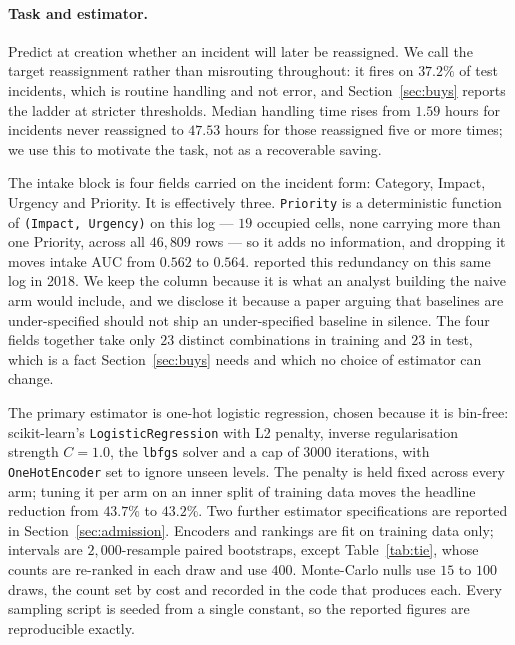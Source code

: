 \documentclass[preprint,12pt]{elsarticle}
\begin{document}
\paragraph{Task and estimator.}
Predict at creation whether an incident will later be reassigned. We call
the target reassignment rather than misrouting throughout: it fires on
$37.2\%$ of test incidents, which is routine handling and not error, and
Section~\ref{sec:buys} reports the ladder at stricter thresholds. Median
handling time rises from $1.59$ hours for incidents never reassigned to
$47.53$ hours for those reassigned five or more times; we use this to
motivate the task, not as a recoverable saving.

The intake block is four fields carried on the incident form: Category,
Impact, Urgency and Priority. It is effectively three. \texttt{Priority} is a
deterministic function of \texttt{(Impact, Urgency)} on this log --- $19$
occupied cells, none carrying more than one Priority, across all $46{,}809$
rows --- so it adds no information, and dropping it moves intake AUC from
$0.562$ to $0.564$. \citet{sarnovsky2018predictive} reported this redundancy
on this same log in 2018. We keep the column because it is what an analyst
building the naive arm would include, and we disclose it because a paper
arguing that baselines are under-specified should not ship an
under-specified baseline in silence. The four fields together take only $23$
distinct combinations in training and $23$ in test, which is a fact
Section~\ref{sec:buys} needs and which no choice of estimator can change.

The primary estimator is one-hot logistic regression, chosen because it is
bin-free: scikit-learn's \texttt{LogisticRegression} with L2 penalty,
inverse regularisation strength $C=1.0$, the \texttt{lbfgs} solver and a cap
of $3000$ iterations, with \texttt{OneHotEncoder} set to ignore unseen
levels. The penalty is held fixed across every arm; tuning it per arm on an
inner split of training data moves the headline reduction from $43.7\%$ to
$43.2\%$. Two further estimator specifications are reported in
Section~\ref{sec:admission}. Encoders and rankings are fit on training data
only; intervals are $2{,}000$-resample paired bootstraps, except
Table~\ref{tab:tie}, whose counts are re-ranked in each draw and use
$400$. Monte-Carlo nulls use $15$ to $100$ draws, the count set by cost and
recorded in the code that produces each. Every sampling script is seeded
from a single constant, so the reported figures are reproducible exactly.
\end{document}
